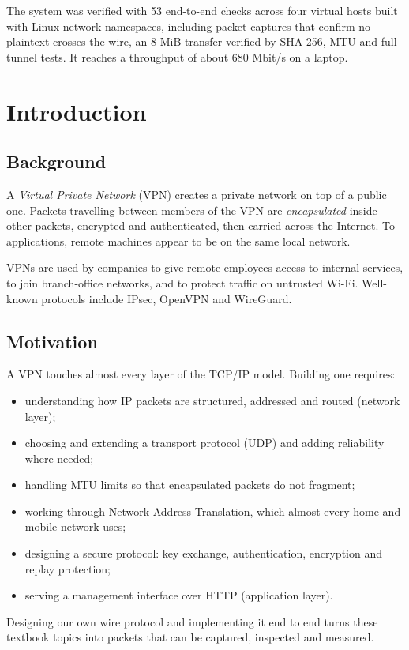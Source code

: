 \documentclass[12pt,a4paper]{report}
\begin{document}
The system was verified with 53 end-to-end checks across four virtual hosts built with
Linux network namespaces, including packet captures that confirm no plaintext crosses
the wire, an 8 MiB transfer verified by SHA-256, MTU and full-tunnel tests. It reaches
a throughput of about 680 Mbit/s on a laptop.

\tableofcontents
\listoffigures
\listoftables

\clearpage
{}


\chapter{Introduction}

\section{Background}
A \emph{Virtual Private Network} (VPN) creates a private network on top of a public
one. Packets travelling between members of the VPN are \emph{encapsulated} inside other
packets, encrypted and authenticated, then carried across the Internet. To
applications, remote machines appear to be on the same local network.

VPNs are used by companies to give remote employees access to internal services, to
join branch-office networks, and to protect traffic on untrusted Wi-Fi. Well-known
protocols include IPsec, OpenVPN and WireGuard.

\section{Motivation}
A VPN touches almost every layer of the TCP/IP model. Building one requires:
\begin{itemize}
  \item understanding how IP packets are structured, addressed and routed (network layer);
  \item choosing and extending a transport protocol (UDP) and adding reliability where needed;
  \item handling MTU limits so that encapsulated packets do not fragment;
  \item working through Network Address Translation, which almost every home and mobile network uses;
  \item designing a secure protocol: key exchange, authentication, encryption and replay protection;
  \item serving a management interface over HTTP (application layer).
\end{itemize}
Designing our own wire protocol and implementing it end to end turns these textbook
topics into packets that can be captured, inspected and measured.
\end{document}
